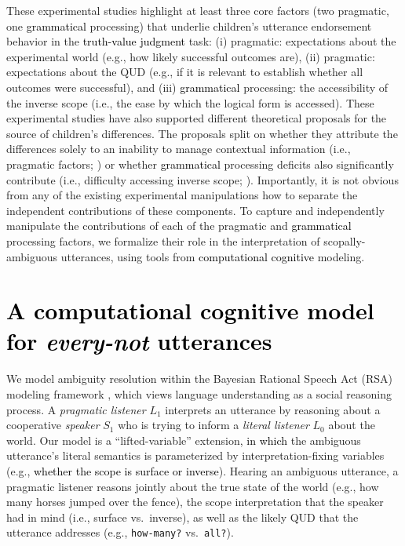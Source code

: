 \documentclass[cm]{glossa}
\newcommand{\lp}[1]{\textcolor{black}{#1}} %
\begin{document}
These experimental studies highlight at least three core factors (two pragmatic, one \lp{grammatical} processing) that underlie children's utterance endorsement behavior in the 
\lp{truth-value judgment}
task: (i)  pragmatic: expectations about the experimental world (e.g., how likely successful outcomes are), (ii) pragmatic: expectations about the QUD (e.g., if it is relevant to establish whether all outcomes were successful), and (iii) \lp{grammatical} processing: the accessibility of the inverse scope (i.e., the ease by which the logical form is accessed). These experimental studies have also supported different theoretical proposals for the source of children's differences. The proposals split on whether they attribute the differences solely to an inability to manage contextual information (i.e., pragmatic factors; \citealp{gualmini2008rise}) or whether \lp{grammatical} processing deficits also significantly contribute (i.e., difficulty accessing inverse scope; \citealp{viauetal2010}). Importantly, it is not obvious from any of the existing experimental manipulations how to separate the independent contributions of these components. To capture and independently manipulate the contributions of each of the pragmatic and \lp{grammatical} processing factors, we formalize their role in the interpretation of scopally-ambiguous utterances, using tools from %
\lp{computational cognitive} modeling.


\section{
\lp{A computational cognitive model for \emph{every-not} utterances}
} \label{every-not-model}

We model  ambiguity resolution within the Bayesian Rational Speech Act (RSA) modeling framework \citep{goodmanfrank2016}, which views language understanding as a social reasoning process. A \textit{pragmatic listener} $L_1$ interprets an utterance by reasoning about a cooperative \textit{speaker} $S_1$ who is trying to inform a \textit{literal listener} $L_0$ about the world. Our model is a ``lifted-variable'' extension,
\lp{in which}
the ambiguous utterance's literal semantics is parameterized by interpretation-fixing variables (e.g., 
\lp{whether the scope is surface or inverse}). Hearing an ambiguous utterance, a pragmatic listener reasons jointly about the true state of the world (e.g., how many horses jumped over the fence), the scope interpretation that the speaker had in mind (i.e., surface vs.~inverse), as well as the likely QUD that the utterance addresses (e.g., \texttt{how-many?} vs.~\texttt{all?}).  
\end{document}
